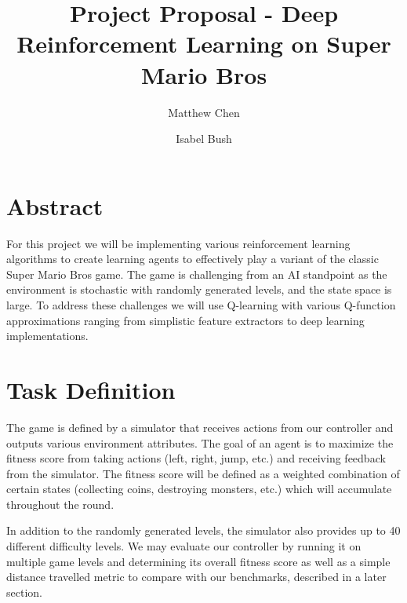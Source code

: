 \documentclass[12pt]{article}
\begin{document}
\nocite{*}

\title{Project Proposal - Deep Reinforcement Learning on Super Mario Bros}

\author{
  Matthew Chen
  \and
  Isabel Bush
}
\date{}
\maketitle


\section{Abstract}

For this project we will be implementing various reinforcement learning algorithms to create learning agents to effectively play a variant of the classic Super Mario Bros game. The game is challenging from an AI standpoint as the environment is stochastic with randomly generated levels, and the state space is large. To address these challenges we will use Q-learning with various Q-function approximations ranging from simplistic feature extractors to deep learning implementations.


\section{Task Definition}

The game is defined by a simulator that receives actions from our controller and outputs various environment attributes. The goal of an agent is to maximize the fitness score from taking actions (left, right, jump, etc.) and receiving feedback from the simulator. The fitness score will be defined as a weighted combination of certain states (collecting coins, destroying monsters, etc.) which will accumulate throughout the round.


In addition to the randomly generated levels, the simulator also provides up to 40 different difficulty levels. We may evaluate our controller by running it on multiple game levels and determining its overall fitness score as well as a simple distance travelled metric to compare with our benchmarks, described in a later section.
\end{document}
